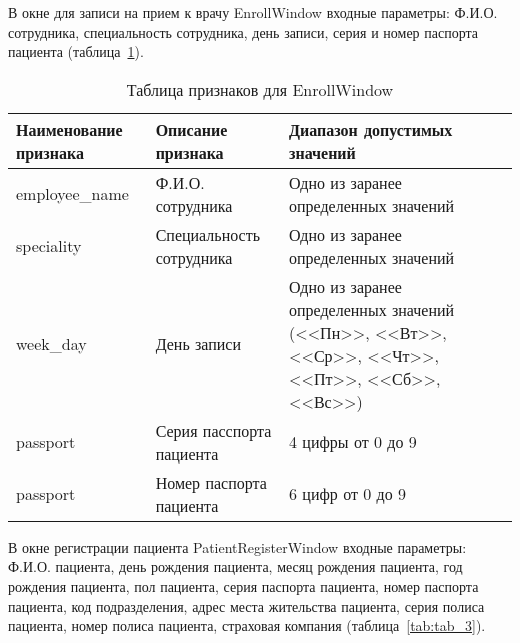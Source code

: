 В окне для записи на прием к врачу EnrollWindow входные параметры: Ф.И.О. сотрудника, специальность сотрудника, день записи, серия и номер паспорта пациента (таблица~\ref{tab:tab_2}). 

\begin{table}[ht]
\caption{Таблица признаков для EnrollWindow}
\label{tab:tab_2}
\begin{center}
\begin{tabularx}{\linewidth}{|X|X|X|}
\hline
 Наименование признака & Описание признака & Диапазон допустимых значений\\
\hline
 employee\_name & Ф.И.О. сотрудника & Одно из заранее определенных значений\\
\hline
 speciality & Специальность сотрудника & Одно из заранее определенных значений\\
\hline
 week\_day & День записи & Одно из заранее определенных значений (<<Пн>>, <<Вт>>, <<Ср>>, <<Чт>>, <<Пт>>, <<Сб>>, <<Вс>>)\\
\hline
 passport & Серия пасспорта пациента & 4 цифры от 0 до 9 \\
\hline
 passport & Номер паспорта пациента & 6 цифр от 0 до 9 \\
\hline
\end{tabularx}
\end{center}
\end{table}

В окне регистрации пациента PatientRegisterWindow входные параметры: Ф.И.О. пациента, день рождения пациента, месяц рождения пациента, год рождения пациента, пол пациента, серия паспорта пациента, номер паспорта пациента, код подразделения, адрес места жительства пациента, серия полиса пациента, номер полиса пациента, страховая компания (таблица~\ref{tab:tab_3}). 

